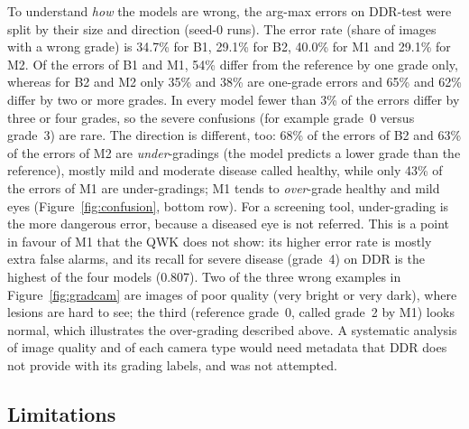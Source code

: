 To understand \emph{how} the models are wrong, the arg-max errors on DDR-test were split by their size and direction (seed-0 runs). The error rate (share of images with a wrong grade) is 34.7\% for B1, 29.1\% for B2, 40.0\% for M1 and 29.1\% for M2. Of the errors of B1 and M1, 54\% differ from the reference by one grade only, whereas for B2 and M2 only 35\% and 38\% are one-grade errors and 65\% and 62\% differ by two or more grades. In every model fewer than 3\% of the errors differ by three or four grades, so the severe confusions (for example grade~0 versus grade~3) are rare. The direction is different, too: 68\% of the errors of B2 and 63\% of the errors of M2 are \emph{under}-gradings (the model predicts a lower grade than the reference), mostly mild and moderate disease called healthy, while only 43\% of the errors of M1 are under-gradings; M1 tends to \emph{over}-grade healthy and mild eyes (Figure~\ref{fig:confusion}, bottom row). For a screening tool, under-grading is the more dangerous error, because a diseased eye is not referred. This is a point in favour of M1 that the QWK does not show: its higher error rate is mostly extra false alarms, and its recall for severe disease (grade~4) on DDR is the highest of the four models (0.807). Two of the three wrong examples in Figure~\ref{fig:gradcam} are images of poor quality (very bright or very dark), where lesions are hard to see; the third (reference grade~0, called grade~2 by M1) looks normal, which illustrates the over-grading described above. A systematic analysis of image quality and of each camera type would need metadata that DDR does not provide with its grading labels, and was not attempted.

\subsection{Limitations}
\label{subsec:limitations}

